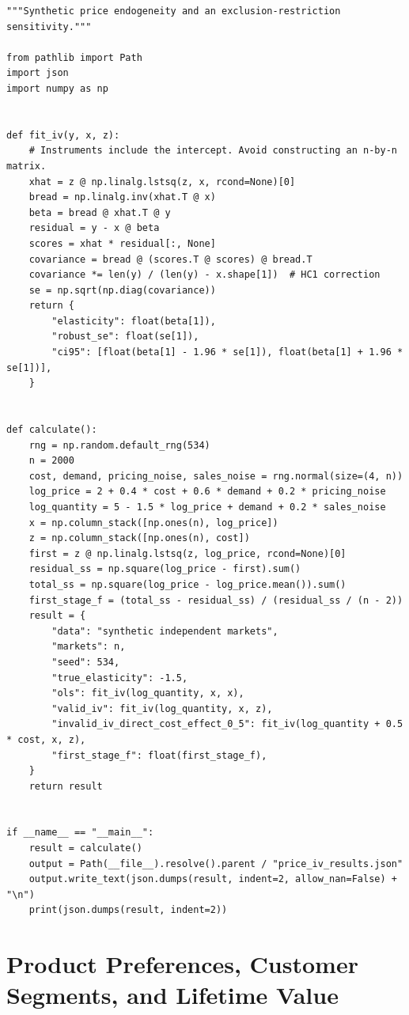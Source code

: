 \begin{Verbatim}[breaklines,breakanywhere,fontsize=\small]
"""Synthetic price endogeneity and an exclusion-restriction sensitivity."""

from pathlib import Path
import json
import numpy as np


def fit_iv(y, x, z):
    # Instruments include the intercept. Avoid constructing an n-by-n matrix.
    xhat = z @ np.linalg.lstsq(z, x, rcond=None)[0]
    bread = np.linalg.inv(xhat.T @ x)
    beta = bread @ xhat.T @ y
    residual = y - x @ beta
    scores = xhat * residual[:, None]
    covariance = bread @ (scores.T @ scores) @ bread.T
    covariance *= len(y) / (len(y) - x.shape[1])  # HC1 correction
    se = np.sqrt(np.diag(covariance))
    return {
        "elasticity": float(beta[1]),
        "robust_se": float(se[1]),
        "ci95": [float(beta[1] - 1.96 * se[1]), float(beta[1] + 1.96 * se[1])],
    }


def calculate():
    rng = np.random.default_rng(534)
    n = 2000
    cost, demand, pricing_noise, sales_noise = rng.normal(size=(4, n))
    log_price = 2 + 0.4 * cost + 0.6 * demand + 0.2 * pricing_noise
    log_quantity = 5 - 1.5 * log_price + demand + 0.2 * sales_noise
    x = np.column_stack([np.ones(n), log_price])
    z = np.column_stack([np.ones(n), cost])
    first = z @ np.linalg.lstsq(z, log_price, rcond=None)[0]
    residual_ss = np.square(log_price - first).sum()
    total_ss = np.square(log_price - log_price.mean()).sum()
    first_stage_f = (total_ss - residual_ss) / (residual_ss / (n - 2))
    result = {
        "data": "synthetic independent markets",
        "markets": n,
        "seed": 534,
        "true_elasticity": -1.5,
        "ols": fit_iv(log_quantity, x, x),
        "valid_iv": fit_iv(log_quantity, x, z),
        "invalid_iv_direct_cost_effect_0_5": fit_iv(log_quantity + 0.5 * cost, x, z),
        "first_stage_f": float(first_stage_f),
    }
    return result


if __name__ == "__main__":
    result = calculate()
    output = Path(__file__).resolve().parent / "price_iv_results.json"
    output.write_text(json.dumps(result, indent=2, allow_nan=False) + "\n")
    print(json.dumps(result, indent=2))
\end{Verbatim}

\hypertarget{M04-m4.-product-preferences-customer-segments-and-lifetime-value}{%
\chapter{Product Preferences, Customer Segments, and Lifetime
Value}\label{M04-m4.-product-preferences-customer-segments-and-lifetime-value}}

